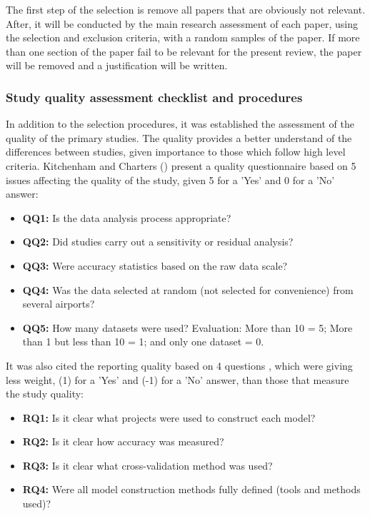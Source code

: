 The first step of the selection is remove all papers that are obviously not relevant. After, it will be conducted by the main research assessment of each paper, using the selection and exclusion criteria, with a random samples of the paper. If more than one section of the paper fail to be relevant for the present review, the paper will be removed and a justification will be written.


\subsubsection{Study quality assessment checklist and procedures}

In addition to the selection procedures, it was established the assessment of the quality of the primary studies. The quality provides a better understand of the differences between studies, given importance to those which follow high level criteria. Kitchenham and Charters (\citeyear{kitchenham2007guidelines}) present a quality questionnaire based on 5 issues affecting the quality of the study, given 5 for a 'Yes' and 0 for a 'No' answer:
    \begin{itemize}
    \item \textbf{QQ1:} Is the data analysis process appropriate?
    \item \textbf{QQ2:} Did studies carry out a sensitivity or residual analysis?
    \item \textbf{QQ3:} Were accuracy statistics based on the raw data scale?
    \item \textbf{QQ4:} Was the data selected at random (not selected for convenience) from several airports?
    \item \textbf{QQ5:} How many datasets were used? Evaluation: More than 10 = 5; More than 1 but less than 10 = 1; and only one dataset = 0.
    \end{itemize}

It was also cited the reporting quality based on 4 questions \cite{kitchenham2007guidelines}, which were giving less weight, (1) for a 'Yes' and (-1) for a 'No' answer, than those that measure the study quality:
    \begin{itemize}
    \item \textbf{RQ1:} Is it clear what projects were used to construct each model?
    \item \textbf{RQ2:} Is it clear how accuracy was measured?
    \item \textbf{RQ3:} Is it clear what cross-validation method was used?
    \item \textbf{RQ4:} Were all model construction methods fully defined (tools and methods used)?
    \end{itemize}

